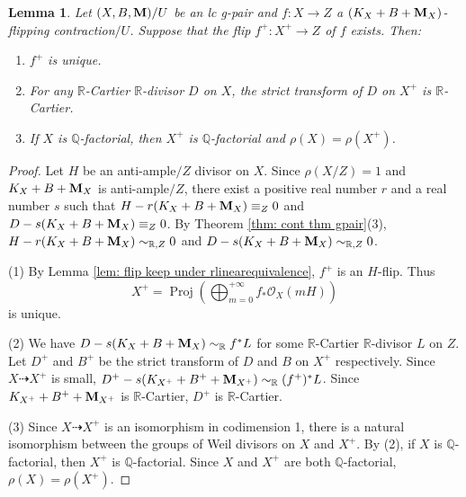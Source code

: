 \documentclass[11pt]{amsart}
\numberwithin{equation}{section}
\newcommand{\Mm}{{\bf{M}}}
\newcommand{\Qq}{\mathbb{Q}}
\newcommand{\Rr}{\mathbb{R}}
\newcommand{\proj}{\operatorname{Proj}}
\newtheorem{lem}[thm]{Lemma}
\theoremstyle{definition}
\theoremstyle{definition}
\theoremstyle{definition}
\begin{document}
\begin{lem}\label{lem: uniqueness flip}
    Let $(X,B,\Mm)/U$ be an lc g-pair and $f: X\rightarrow Z$ a $(K_X+B+\Mm_X)$-flipping contraction$/U$. Suppose that the flip $f^+: X^+\rightarrow Z$ of $f$ exists. Then:
 \begin{enumerate}
     \item $f^+$ is unique.
     \item For any $\Rr$-Cartier $\Rr$-divisor $D$ on $X$, the strict transform of $D$ on $X^+$ is $\Rr$-Cartier.
     \item If $X$ is $\Qq$-factorial, then $X^+$ is $\Qq$-factorial and $\rho(X)=\rho(X^+)$.
 \end{enumerate}
\end{lem}
\begin{proof}
   Let $H$ be an anti-ample$/Z$ divisor on $X$. Since $\rho(X/Z)=1$ and $K_X+B+\Mm_X$ is anti-ample$/Z$, there exist a positive real number $r$ and a real number $s$ such that $H-r(K_X+B+\Mm_X)\equiv_Z0$ and $D-s(K_X+B+\Mm_X)\equiv_Z0$. By Theorem \ref{thm: cont thm gpair}(3),  $H-r(K_X+B+\Mm_X)\sim_{\mathbb R,Z}0$ and $D-s(K_X+B+\Mm_X)\sim_{\mathbb R,Z}0$.  

   (1) By Lemma \ref{lem: flip keep under rlinearequivalence}, $f^+$ is an $H$-flip. Thus
   $$X^+=\proj\left(\bigoplus_{m=0}^{+\infty}f_*\mathcal{O}_X(mH)\right)$$
   is unique.

   (2) We have $D-s(K_X+B+\Mm_X)\sim_{\mathbb R}f^*L$ for some $\Rr$-Cartier $\Rr$-divisor $L$ on $Z$. Let $D^+$ and $B^+$ be the strict transform of $D$ and $B$ on $X^+$ respectively. Since $X\dashrightarrow X^+$ is small, $D^+-s(K_{X^+}+B^++\Mm_{X^+})\sim_{\mathbb R}(f^+)^*L$. Since $K_{X^+}+B^++\Mm_{X^+}$ is $\Rr$-Cartier, $D^+$ is $\Rr$-Cartier.

   (3) Since $X\dashrightarrow X^+$ is an isomorphism in codimension 1, there is a natural isomorphism between the groups of Weil divisors on $X$ and $X^+$. By (2), if $X$ is $\Qq$-factorial, then $X^+$ is $\Qq$-factorial. Since $X$ and $X^+$ are both $\mathbb Q$-factorial, $\rho(X)=\rho(X^+)$. 
\end{proof}
\end{document}
